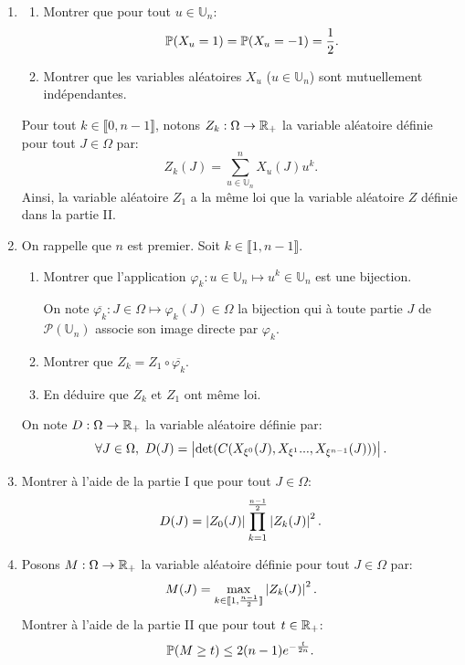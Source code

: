 \begin{enumerate}
 \item 
  \begin{enumerate}
   \item Montrer que pour tout $u\in \mathbb{U}_{n}$:
 \[ \mathbb{P}(X_{u} = 1) = \mathbb{P}(X_{u} = -1) = \frac{1}{2}.\]
   \item Montrer que les variables aléatoires $X_{u}$ ($u\in \mathbb{U}_{n}$) sont mutuellement indépendantes. 
  \end{enumerate}

Pour tout $k\in \llbracket 0, n - 1\rrbracket$, notons $Z_{k} : \Omega \to \mathbb{R}_{+}$ la variable aléatoire définie pour tout $J \in \Omega$ par:
\[ Z_{k}(J) = \sum_{u\in \mathbb{U}_{n}}^{n}X_{u}(J)u^{k}.\]
Ainsi, la variable aléatoire $Z_{1}$ a la même loi que la variable aléatoire $Z$ définie dans la partie II.




 \item On rappelle que $n$ est premier. Soit $k\in \llbracket 1, n-1\rrbracket$. 
           \begin{enumerate}
            \item Montrer que l'application $\varphi_{k}: u\in \mathbb{U}_{n} \mapsto u^{k}\in \mathbb{U}_{n}$ est une bijection.
            
            On note $\overline{\varphi_{k}}: J\in \Omega \mapsto \varphi_{k}(J)\in \Omega$ la bijection qui à toute partie $J$ de $\mathcal{P}(\mathbb{U}_{n})$ associe son image directe par $\varphi_{k}$.
            \item Montrer que $Z_{k} = Z_{1}\circ \overline{\varphi_{k}}$.
            \item En déduire que $Z_{k}$ et $Z_{1}$ ont même loi.
           \end{enumerate}
           
On note $D:\Omega \to \mathbb{R}_{+}$ la variable aléatoire définie par:
\[ \forall J \in \Omega,\ D(J) = \left\vert\det(C(X_{\xi^{0}}(J), X_{\xi^{1}}..., X_{\xi^{n-1}}(J)))\right\vert.\]

 \item Montrer à l'aide de la partie I que pour tout $J\in \Omega$:
 \[ D(J) = \left\vert Z_{0}(J)\right\vert\prod_{k=1}^{\frac{n-1}{2}}\left\vert Z_{k}(J)\right\vert^{2}.\]

 \item Posons $M:\Omega \to \mathbb{R}_{+}$ la variable aléatoire définie pour tout $J \in \Omega$ par:
 \[ M(J) = \max_{k\in \llbracket 1, \frac{n-1}{2}\rrbracket}\left\vert Z_{k}(J)\right\vert^{2}.\]
 Montrer à l'aide de la partie II que pour tout $t\in \mathbb{R}_{+}$:
 \[ \mathbb{P}(M\geq t) \leq 2(n-1)e^{-\frac{t}{2n}}.\]
 

\end{enumerate}
